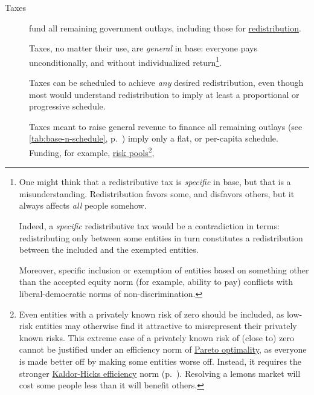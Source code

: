 \begin{description}
	\item[Taxes]  \label{sec:taxes} fund all remaining government outlays, including those for \hyperref[sec:redistributive-policy]{redistribution}.
	
	Taxes, no matter their use, are \emph{general} in base: everyone pays unconditionally, and without individualized return\footnote{
		One might think that a redistributive tax is \emph{specific} in base, but that is a misunderstanding. Redistribution favors some, and disfavors others, but it always affects \emph{all} people somehow.
		
		Indeed, a \emph{specific} redistributive tax would be a contradiction in terms: redistributing only between some entities in turn constitutes a redistribution between the included and the exempted entities.
		
		Moreover, specific inclusion or exemption of entities based on something other than the accepted equity norm (for example, ability to pay) conflicts with liberal-democratic norms of non-discrimination.}.
	 
	Taxes can be scheduled to achieve \emph{any} desired redistribution, even though most would understand redistribution to imply at least a proportional or progressive schedule. 
	
	
	
	Taxes meant to raise general revenue to finance all remaining outlays (see \autoref{tab:base-n-schedule}, p.~\pageref{tab:base-n-schedule}) imply only a flat, or per-capita schedule. Funding, for example, \hyperref[sec:adverse-selection]{risk pools}\footnote{
		Even entities with a privately known risk of zero should be included, as low-risk entities may otherwise find it attractive to misrepresent their privately known risks. This extreme case of a privately known risk of (close to) zero cannot be justified under an efficiency norm of \hyperref[sec:Pareto]{Pareto optimality}, as everyone is made better off by making some entities worse off. Instead, it requires the stronger \hyperref[sec:KaldorHicks]{Kaldor-Hicks efficiency} norm (p.~\pageref{sec:Efficiency})\citep{Kaldor1939,Hicks1939}. Resolving a lemons market will cost some people less than it will benefit others.}, 
		

\end{description}
